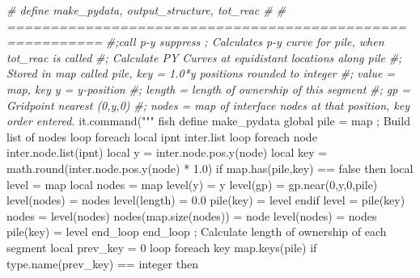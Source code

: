 \documentclass[a4paper, nobind]{templates/ociamthesis}
\newenvironment{Shaded}{\begin{snugshade}}{\end{snugshade}}
\newcommand{\CommentTok}[1]{\textcolor[rgb]{0.56,0.35,0.01}{\textit{#1}}}
\newcommand{\NormalTok}[1]{#1}
\newcommand{\StringTok}[1]{\textcolor[rgb]{0.31,0.60,0.02}{#1}}
\renewenvironment{Shaded}
{
  \vspace{10pt}%
  \begin{snugshade}%
}{%
  \end{snugshade}%
  \vspace{8pt}%
}
\begin{document}
\begin{Shaded}
\begin{Highlighting}[]
\CommentTok{\# define make\_pydata, output\_structure, tot\_reac \#}
\CommentTok{\# =========================================================}
\CommentTok{\#;call \textquotesingle{}p{-}y\textquotesingle{} suppress ; Calculates p{-}y curve for pile, when tot\_reac is called}
\CommentTok{\#; Calculate PY Curves at equidistant locations along pile}
\CommentTok{\#; Stored in map called pile, key = 1.0*y positions rounded to integer}
\CommentTok{\#;    value = map, key \textquotesingle{}y\textquotesingle{} = y{-}position}
\CommentTok{\#;                     \textquotesingle{}length\textquotesingle{} = length of ownership of this segment}
\CommentTok{\#;                     \textquotesingle{}gp\textquotesingle{} = Gridpoint nearest (0,y,0)}
\CommentTok{\#;                     \textquotesingle{}nodes\textquotesingle{} = map of interface nodes at that position, key order entered.}
\NormalTok{it.command(}\StringTok{"""}
\StringTok{fish define make\_pydata}
\StringTok{    global pile = map}
\StringTok{    ; Build list of nodes}
\StringTok{    loop foreach local ipnt inter.list}
\StringTok{        loop foreach node inter.node.list(ipnt)}
\StringTok{            local y = inter.node.pos.y(node)}
\StringTok{            local key = math.round(inter.node.pos.y(node) * 1.0)}
\StringTok{            if map.has(pile,key) == false then}
\StringTok{                local level = map}
\StringTok{                local nodes = map}
\StringTok{                level(\textquotesingle{}y\textquotesingle{}) = y}
\StringTok{                level(\textquotesingle{}gp\textquotesingle{}) = gp.near(0,y,0,\textquotesingle{}pile\textquotesingle{})}
\StringTok{                level(\textquotesingle{}nodes\textquotesingle{}) = nodes}
\StringTok{                level(\textquotesingle{}length\textquotesingle{}) = 0.0}
\StringTok{                pile(key) = level}
\StringTok{            endif}
\StringTok{            level = pile(key)}
\StringTok{            nodes = level(\textquotesingle{}nodes\textquotesingle{})}
\StringTok{            nodes(map.size(nodes)) = node}
\StringTok{            level(\textquotesingle{}nodes\textquotesingle{}) = nodes}
\StringTok{            pile(key) = level}
\StringTok{        end\_loop}
\StringTok{    end\_loop}
\StringTok{    ; Calculate length of ownership of each segment}
\StringTok{    local prev\_key = \textquotesingle{}0\textquotesingle{}}
\StringTok{    loop foreach key map.keys(pile)}
\StringTok{        if type.name(prev\_key) == \textquotesingle{}integer\textquotesingle{} then}

\end{Highlighting}
\end{Shaded}
\end{document}
